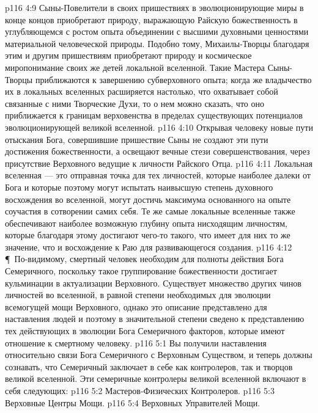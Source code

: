 \vs p116 4:9 Сыны\hyp{}Повелители в своих пришествиях в эволюционирующие миры в конце концов приобретают природу, выражающую Райскую божественность в углубляющемся с ростом опыта объединении с высшими духовными ценностями материальной человеческой природы. Подобно тому, Михаилы\hyp{}Творцы благодаря этим и другим пришествиям приобретают природу и космическое миропонимание своих же детей локальной вселенной. Такие Мастера Сыны\hyp{}Творцы приближаются к завершению субверховного опыта; когда же владычество их в локальных вселенных расширяется настолько, что охватывает собой связанные с ними Творческие Духи, то о нем можно сказать, что оно приближается к границам верховенства в пределах существующих потенциалов эволюционирующей великой вселенной.
\vs p116 4:10 Открывая человеку новые пути отыскания Бога, совершившие пришествие Сыны не создают эти пути достижения божественности, а освещают вечные стези совершенствования, через присутствие Верховного ведущие к личности Райского Отца.
\vs p116 4:11 Локальная вселенная --- это отправная точка для тех личностей, которые наиболее далеки от Бога и которые поэтому могут испытать наивысшую степень духовного восхождения во вселенной, могут достичь максимума основанного на опыте соучастия в сотворении самих себя. Те же самые локальные вселенные также обеспечивают наиболее возможную глубину опыта нисходящим личностям, которые благодаря этому достигают чего\hyp{}то такого, что имеет для них то же значение, что и восхождение к Раю для развивающегося создания.
\vs p116 4:12 \P\ По\hyp{}видимому, смертный человек необходим для полноты действия Бога Семеричного, поскольку такое группирование божественности достигает кульминации в актуализации Верховного. Существует множество других чинов личностей во вселенной, в равной степени необходимых для эволюции всемогущей мощи Верховного, однако это описание представлено для наставления людей и поэтому в значительной степени сведено к представлению тех действующих в эволюции Бога Семеричного факторов, которые имеют отношение к смертному человеку.
\vs p116 5:1 Вы получили наставления относительно связи Бога Семеричного с Верховным Существом, и теперь должны сознавать, что Семеричный заключает в себе как контролеров, так и творцов великой вселенной. Эти семеричные контролеры великой вселенной включают в себя следующих:
\vs p116 5:2 \bibnobreakspace Мастеров\hyp{}Физических Контролеров.
\vs p116 5:3 \bibnobreakspace Верховные Центры Мощи.
\vs p116 5:4 \bibnobreakspace Верховных Управителей Мощи.

